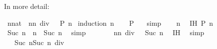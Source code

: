 \begin{isabellebody}
{\isafoldproof}%
%
\isadelimproof
%
\endisadelimproof
%
\begin{isamarkuptext}%
In more detail:%
\end{isamarkuptext}\isamarkuptrue%
\isamarkupfalse%
\ {\isachardoublequoteopen}{\isasymSum}{\isacharbraceleft}{\kern0pt}{}{\isachardot}{\kern0pt}{\isachardot}{\kern0pt}n{\isacharcolon}{\kern0pt}{\isacharcolon}{\kern0pt}nat{\isacharbraceright}{\kern0pt}\ {\isacharequal}{\kern0pt}\ n{\isacharasterisk}{\kern0pt}{\isacharparenleft}{\kern0pt}n{\isacharplus}{\kern0pt}{}{\isacharparenright}{\kern0pt}\ div\ {}{\isachardoublequoteclose}\ {\isacharparenleft}{\kern0pt}\ {\isachardoublequoteopen}{\isacharquery}{\kern0pt}P\ n{\isachardoublequoteclose}{\isacharparenright}{\kern0pt}\isanewline
%
\isadelimproof
%
\endisadelimproof
%
\isatagproof
{}\isamarkupfalse%
\ {\isacharparenleft}{\kern0pt}induction\ n{\isacharparenright}{\kern0pt}\isanewline
\ \ \isamarkupfalse%
\ {\isachardoublequoteopen}{\isacharquery}{\kern0pt}P\ {}{\isachardoublequoteclose}\ \isamarkupfalse%
\ simp\isanewline
{}\isamarkupfalse%
\isanewline
\ \ \isamarkupfalse%
\ n\ \isamarkupfalse%
\ IH{\isacharcolon}{\kern0pt}\ {\isachardoublequoteopen}{\isacharquery}{\kern0pt}P\ n{\isachardoublequoteclose}\isanewline
\ \ \isamarkupfalse%
\ {\isachardoublequoteopen}{\isasymSum}{\isacharbraceleft}{\kern0pt}{}{\isachardot}{\kern0pt}{\isachardot}{\kern0pt}Suc\ n{\isacharbraceright}{\kern0pt}\ {\isacharequal}{\kern0pt}\ {\isasymSum}{\isacharbraceleft}{\kern0pt}{}{\isachardot}{\kern0pt}{\isachardot}{\kern0pt}n{\isacharbraceright}{\kern0pt}\ {\isacharplus}{\kern0pt}\ Suc\ n{\isachardoublequoteclose}\ \isamarkupfalse%
\ simp\isanewline
\ \ \isamarkupfalse%
\ \isamarkupfalse%
\ {\isachardoublequoteopen}{\isasymdots}\ {\isacharequal}{\kern0pt}\ n{\isacharasterisk}{\kern0pt}{\isacharparenleft}{\kern0pt}n{\isacharplus}{\kern0pt}{}{\isacharparenright}{\kern0pt}\ div\ {}\ {\isacharplus}{\kern0pt}\ Suc\ n{\isachardoublequoteclose}\ \isamarkupfalse%
\ IH\ \isamarkupfalse%
\ simp\isanewline
\ \ \isamarkupfalse%
\ \isamarkupfalse%
\ {\isachardoublequoteopen}{\isasymdots}\ {\isacharequal}{\kern0pt}\ {\isacharparenleft}{\kern0pt}Suc\ n{\isacharparenright}{\kern0pt}{\isacharasterisk}{\kern0pt}{\isacharparenleft}{\kern0pt}{\isacharparenleft}{\kern0pt}Suc\ n{\isacharparenright}{\kern0pt}{\isacharplus}{\kern0pt}{}{\isacharparenright}{\kern0pt}\ div\ {}{\isachardoublequoteclose}\ \isamarkupfalse%

\end{isabellebody}

